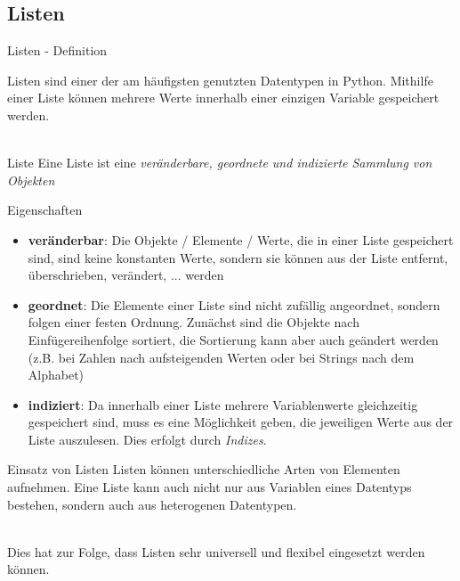         \subsection{Listen}
        
         \begin{frame}{Listen - Definition}
         
            Listen sind einer der am häufigsten genutzten Datentypen in Python. Mithilfe einer Liste können mehrere Werte innerhalb einer einzigen Variable gespeichert werden. \\~\
            
            \begin{block}{Liste}
                Eine Liste ist eine \textit{veränderbare, geordnete und indizierte Sammlung von Objekten}
            \end{block}
         \end{frame}
         
         \begin{frame}{Eigenschaften}
            \begin{itemize}
                \item \textbf{veränderbar}: Die Objekte / Elemente / Werte, die in einer Liste gespeichert sind, sind keine konstanten Werte, sondern sie können aus der Liste entfernt, überschrieben, verändert, ... werden
                
                \item \textbf{geordnet}: Die Elemente einer Liste sind nicht zufällig angeordnet, sondern folgen einer festen Ordnung. Zunächst sind die Objekte nach Einfügereihenfolge sortiert, die Sortierung kann aber auch geändert werden (z.B. bei Zahlen nach aufsteigenden Werten oder bei Strings nach dem Alphabet)
                
                \item \textbf{indiziert}: Da innerhalb einer Liste mehrere Variablenwerte gleichzeitig gespeichert sind, muss es eine Möglichkeit geben, die jeweiligen Werte aus der Liste auszulesen. Dies erfolgt durch \textit{Indizes}.
            \end{itemize}
         \end{frame}
         
         \begin{frame}{Einsatz von Listen}
            Listen können unterschiedliche Arten von Elementen aufnehmen. Eine Liste kann auch nicht nur aus Variablen eines Datentyps bestehen, sondern auch aus heterogenen Datentypen. \\~\
            
            Dies hat zur Folge, dass Listen sehr universell und flexibel eingesetzt werden können.
         \end{frame}
         
